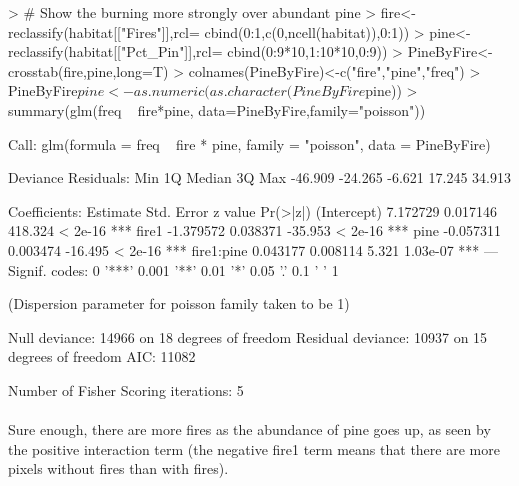 \documentclass{article}
\begin{document}
\begin{Schunk}
\begin{Sinput}
> # Show the burning more strongly over abundant pine
> fire<-reclassify(habitat[["Fires"]],rcl= cbind(0:1,c(0,ncell(habitat)),0:1))
> pine<-reclassify(habitat[["Pct_Pin"]],rcl= cbind(0:9*10,1:10*10,0:9))
> PineByFire<-crosstab(fire,pine,long=T)
> colnames(PineByFire)<-c("fire","pine","freq")
> PineByFire$pine <- as.numeric(as.character(PineByFire$pine))
> summary(glm(freq ~ fire*pine, data=PineByFire,family="poisson"))
\end{Sinput}
\begin{Soutput}
Call:
glm(formula = freq ~ fire * pine, family = "poisson", data = PineByFire)

Deviance Residuals: 
    Min       1Q   Median       3Q      Max  
-46.909  -24.265   -6.621   17.245   34.913  

Coefficients:
             Estimate Std. Error z value Pr(>|z|)    
(Intercept)  7.172729   0.017146 418.324  < 2e-16 ***
fire1       -1.379572   0.038371 -35.953  < 2e-16 ***
pine        -0.057311   0.003474 -16.495  < 2e-16 ***
fire1:pine   0.043177   0.008114   5.321 1.03e-07 ***
---
Signif. codes:  0 '***' 0.001 '**' 0.01 '*' 0.05 '.' 0.1 ' ' 1

(Dispersion parameter for poisson family taken to be 1)

    Null deviance: 14966  on 18  degrees of freedom
Residual deviance: 10937  on 15  degrees of freedom
AIC: 11082

Number of Fisher Scoring iterations: 5
\end{Soutput}
\end{Schunk}

\paragraph{}
Sure enough, there are more fires as the abundance of pine goes up, as seen by the positive interaction term (the negative fire1 term means that there are more pixels without fires than with fires).
\end{document}
